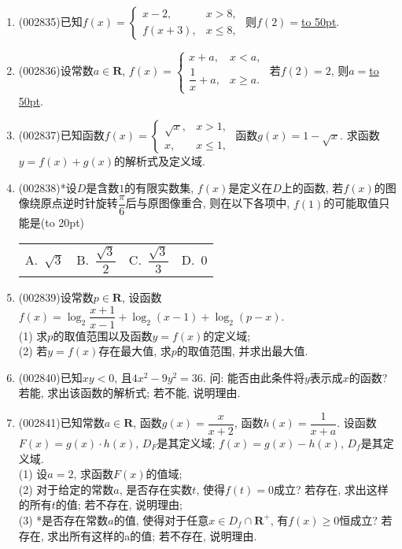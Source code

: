\documentclass[10pt,a4paper]{article}
\newcommand{\blank}[1]{\underline{\hbox to #1pt{}}}
\newcommand{\bracket}[1]{(\hbox to #1pt{})}
\newcommand{\fourch}[4]{\par\begin{tabular}{p{.23\textwidth}p{.23\textwidth}p{.23\textwidth}p{.23\textwidth}}
A.~#1 &B.~#2& C.~#3& D.~#4
\end{tabular}}
\begin{document}
\begin{enumerate}[1.]
(2) 已知函数$f(x)=\begin{cases} 2-x, & x<-2, \\ x^2, & -2\le x<1, \\ x, & x\ge 1. \end{cases}$ 若$f(x)=2$, 则$x$=\blank{50}.
\item {\tiny (002835)}已知$f(x)=\begin{cases} x-2, & x>8, \\ f(x+3), & x\le 8, \end{cases}$ 则$f(2)=$\blank{50}.
\item {\tiny (002836)}设常数$a\in \mathbf{R}$, $f(x)=\begin{cases}x+a, &x<a, \\ \dfrac 1x+a, & x\ge a. \end{cases}$ 若$f(2)=2$, 则$a=$\blank{50}.
\item {\tiny (002837)}已知函数$f(x)=\begin{cases} \sqrt x, & x>1, \\ x, &x\le 1,  \end{cases}$ 函数$g(x)=1-\sqrt x$. 求函数$y=f(x)+g(x)$的解析式及定义域.
\item {\tiny (002838)}*设$D$是含数$1$的有限实数集, $f(x)$是定义在$D$上的函数, 若$f(x)$的图像绕原点逆时针旋转$\dfrac \pi6$后与原图像重合, 则在以下各项中, $f(1)$的可能取值只能是\bracket{20}
\fourch{$\sqrt3$}{$\dfrac{\sqrt{3}}2$}{$\dfrac{\sqrt{3}}3$}{$0$}
\item {\tiny (002839)}设常数$p\in \mathbf{R}$, 设函数$f(x)=\log_2\dfrac{x+1}{x-1}+\log_2(x-1)+\log_2(p-x)$.\\
(1) 求$p$的取值范围以及函数$y=f(x)$的定义域;\\
(2) 若$y=f(x)$存在最大值, 求$p$的取值范围, 并求出最大值.
\item {\tiny (002840)}已知$xy<0$, 且$4x^2-9y^2=36$. 问: 能否由此条件将$y$表示成$x$的函数? 若能, 求出该函数的解析式; 若不能, 说明理由.
\item {\tiny (002841)}已知常数$a\in \mathbf{R}$, 函数$g(x)=\dfrac x{x+2}$, 函数$h(x)=\dfrac 1{x+a}$. 设函数$F(x)=g(x)\cdot h(x)$, $D_F$是其定义域; $f(x)=g(x)-h(x)$, $D_f$是其定义域.\\
(1) 设$a=2$, 求函数$F(x)$的值域;\\
(2) 对于给定的常数$a$, 是否存在实数$t$, 使得$f(t)=0$成立? 若存在, 求出这样的所有$t$的值; 若不存在, 说明理由;\\
(3) *是否存在常数$a$的值, 使得对于任意$x\in {D_f}\cap \mathbf{R}^+$, 有$f(x)\ge 0$恒成立? 若存在, 求出所有这样的a的值; 若不存在, 说明理由.

\end{enumerate}
\end{document}
